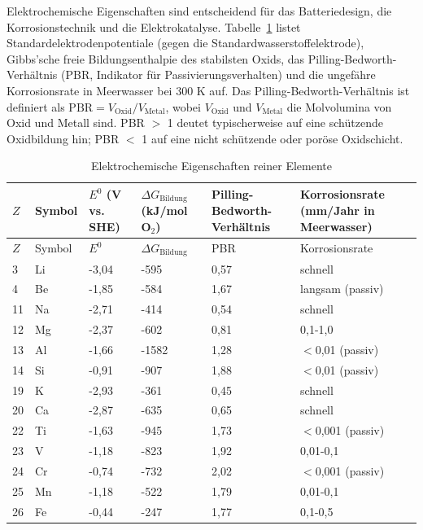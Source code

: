 \documentclass[12pt,a4paper]{article}
\begin{document}
	Elektrochemische Eigenschaften sind entscheidend für das Batteriedesign, die Korrosionstechnik und die Elektrokatalyse. Tabelle~\ref{tab:electrochemical-properties-func} listet Standardelektrodenpotentiale (gegen die Standardwasserstoffelektrode), Gibbs'sche freie Bildungsenthalpie des stabilsten Oxids, das Pilling-Bedworth-Verhältnis (PBR, Indikator für Passivierungsverhalten) und die ungefähre Korrosionsrate in Meerwasser bei 300 K auf. Das Pilling-Bedworth-Verhältnis ist definiert als \(\text{PBR} = V_{\text{Oxid}} / V_{\text{Metal}}\), wobei \(V_{\text{Oxid}}\) und \(V_{\text{Metal}}\) die Molvolumina von Oxid und Metall sind. PBR $>$ 1 deutet typischerweise auf eine schützende Oxidbildung hin; PBR $<$ 1 auf eine nicht schützende oder poröse Oxidschicht.
	
	\begin{longtable}{p{0.8cm}p{1.2cm}p{2.5cm}p{2.5cm}p{2.5cm}p{2.5cm}}
		\caption{Elektrochemische Eigenschaften reiner Elemente} \label{tab:electrochemical-properties-func} \\
		\toprule
		\(Z\) & Symbol & \(E^0\) (V vs. SHE) & \(\Delta G_{\text{Bildung}}\) (kJ/mol O\(_2\)) & Pilling-Bedworth-Verhältnis & Korrosionsrate (mm/Jahr in Meerwasser) \\
		\midrule
		\endfirsthead
		\toprule
		\(Z\) & Symbol & \(E^0\) & \(\Delta G_{\text{Bildung}}\) & PBR & Korrosionsrate \\
		\midrule
		\endhead
		3  & Li & -3,04 & -595 & 0,57 & schnell \\
		4  & Be & -1,85 & -584 & 1,67 & langsam (passiv) \\
		11 & Na & -2,71 & -414 & 0,54 & schnell \\
		12 & Mg & -2,37 & -602 & 0,81 & 0,1-1,0 \\
		13 & Al & -1,66 & -1582 & 1,28 & $<$0,01 (passiv) \\
		14 & Si & -0,91 & -907 & 1,88 & $<$0,01 (passiv) \\
		19 & K  & -2,93 & -361 & 0,45 & schnell \\
		20 & Ca & -2,87 & -635 & 0,65 & schnell \\
		22 & Ti & -1,63 & -945 & 1,73 & $<$0,001 (passiv) \\
		23 & V  & -1,18 & -823 & 1,92 & 0,01-0,1 \\
		24 & Cr & -0,74 & -732 & 2,02 & $<$0,001 (passiv) \\
		25 & Mn & -1,18 & -522 & 1,79 & 0,01-0,1 \\
		26 & Fe & -0,44 & -247 & 1,77 & 0,1-0,5 \\

\end{longtable}
\end{document}
